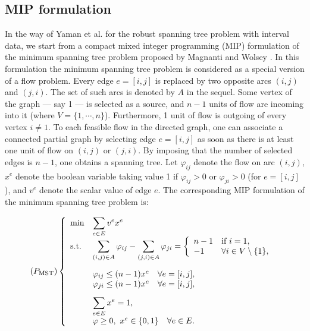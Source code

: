 \documentclass[final,3p,times]{elsarticle}
\begin{document}
\subsection{MIP formulation}
In the way of Yaman et al. \cite{YamKP01} for the robust spanning tree problem with interval data, we start from a compact mixed integer programming (MIP) formulation of the minimum spanning tree problem proposed by Magnanti and Wolsey \cite{MagnW95}. In this formulation the minimum spanning tree problem is considered as a special version of a flow problem. Every edge $e=[i,j]$ is replaced by two opposite arcs $(i,j)$ and $(j,i)$. The set of such arcs is denoted by $A$ in the sequel. Some vertex of the graph --- say 1 --- is selected as a source, and $n-1$ units of flow are incoming into it (where $V = \{1,\cdots,n\}$). Furthermore, 1 unit of flow is outgoing of every vertex $i \neq 1$. To each feasible flow in the directed graph, one can associate a connected partial graph by selecting edge $e=[i,j]$ as soon as there is at least one unit of flow on $(i,j)$ or $(j,i)$. By imposing that the number of selected edges is $n-1$, one obtains a spanning tree.
Let $\varphi_{ij}$ denote the flow on arc $(i,j)$, $x^e$ denote the boolean variable taking value 1 if $\varphi_{ij}>0$ or 
 $\varphi_{ji}>0$ (for $e =[i,j]$), and $v^e$ denote the scalar value of edge $e$. The corresponding MIP formulation of the minimum spanning tree problem is:

$$(P_{\mbox{\sc mst}})\left\{\begin{array}{ll}
 \min & \displaystyle \sum_{e\in E} v^e x^e\\
  \mbox{s.t.} & \displaystyle \sum_{(i,j) \in A} \varphi_{ij} - \displaystyle \sum_{(j,i) \in A} \varphi_{ji} = \left\{\begin{array}{ll}
	n - 1 & \mbox{if } i=1,\\
	-1 & \forall i \in V \setminus \{1\},
	\end{array}\right.\\ [5ex]	
&\varphi_{ij} \leq (n-1) x^e \quad \forall e =[i,j],	 \\
&\varphi_{ji} \leq (n-1) x^e \quad \forall e =[i,j],\\ [2ex]	
&\displaystyle \sum_{e \in E} x^e = 1,\\
&\varphi \geq 0, ~x^e \in \{0,1\} \quad \forall e \in E.	 
\end{array}\right.$$   
\end{document}
